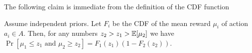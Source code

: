 %
%
%
%
%
%

The following claim is immediate from the definition of the CDF
function
\begin{claim}
Assume independent priors. Let $F_i$ be the CDF of the mean reward
$\mu_i$ of action $a_i\in A$. Then, for any numbers
$z_2>z_1>\E[\mu_2]$ we have
    $\Pr[\text{$\mu_1\leq z_1$ and $\mu_2\geq z_2$}] = F_1(z_1)(1-F_2(z_2)) $.
\end{claim}




